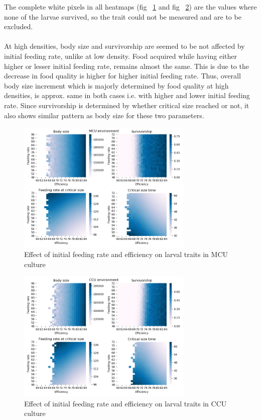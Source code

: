 The complete white pixels in all heatmaps (fig ~\ref{fig:fr vs eff mcu} and fig ~\ref{fig:fr vs eff ccu}) are the values where none of the larvae survived, so the trait could not be measured and are to be excluded.
\\ \\
At high densities, body size and survivorship are seemed to be not affected by initial feeding rate, unlike at low density. Food acquired while having either higher or lesser initial feeding rate, remains almost the same. This is due to the decrease in food quality is higher for higher initial feeding rate. Thus, overall body size increment which is majorly determined by food quality at high densities, is approx. same in both cases i.e. with higher and lower initial feeding rate. Since survivorship is determined by whether critical size reached or not, it also shows similar pattern as body size for these two parameters.
\newpage
\begin{figure}
  \centering
  \includegraphics[width=0.75\textwidth]{C3/Figs/Feeding rate_vs_Efficiency_MCU}
  \caption{Effect of initial feeding rate and efficiency on larval traits in MCU culture}
  \label{fig:fr vs eff mcu}
\end{figure}
\begin{figure}
  \centering
  \includegraphics[width=0.75\textwidth]{C3/Figs/Feeding rate_vs_Efficiency_CCU}
  \caption{Effect of initial feeding rate and efficiency on larval traits in CCU culture}
  \label{fig:fr vs eff ccu}
\end{figure}\\


\pagebreak


